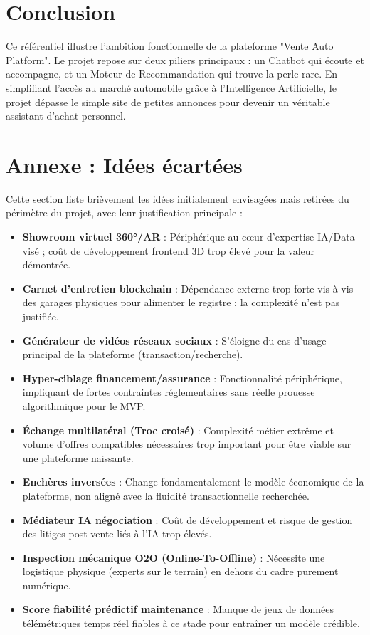 \documentclass[11pt,a4paper]{article}
\begin{document}
\section{Conclusion}
Ce référentiel illustre l'ambition fonctionnelle de la plateforme "Vente Auto Platform". Le projet repose sur deux piliers principaux : un Chatbot qui écoute et accompagne, et un Moteur de Recommandation qui trouve la perle rare. En simplifiant l'accès au marché automobile grâce à l'Intelligence Artificielle, le projet dépasse le simple site de petites annonces pour devenir un véritable assistant d'achat personnel.

\newpage
\appendix
\section{Annexe : Idées écartées}
Cette section liste brièvement les idées initialement envisagées mais retirées du périmètre du projet, avec leur justification principale :

\begin{itemize}
    \item \textbf{Showroom virtuel 360°/AR} : Périphérique au cœur d'expertise IA/Data visé ; coût de développement frontend 3D trop élevé pour la valeur démontrée.
    \item \textbf{Carnet d'entretien blockchain} : Dépendance externe trop forte vis-à-vis des garages physiques pour alimenter le registre ; la complexité n'est pas justifiée.
    \item \textbf{Générateur de vidéos réseaux sociaux} : S'éloigne du cas d'usage principal de la plateforme (transaction/recherche).
    \item \textbf{Hyper-ciblage financement/assurance} : Fonctionnalité périphérique, impliquant de fortes contraintes réglementaires sans réelle prouesse algorithmique pour le MVP.
    \item \textbf{Échange multilatéral (Troc croisé)} : Complexité métier extrême et volume d'offres compatibles nécessaires trop important pour être viable sur une plateforme naissante.
    \item \textbf{Enchères inversées} : Change fondamentalement le modèle économique de la plateforme, non aligné avec la fluidité transactionnelle recherchée.
    \item \textbf{Médiateur IA négociation} : Coût de développement et risque de gestion des litiges post-vente liés à l'IA trop élevés.
    \item \textbf{Inspection mécanique O2O (Online-To-Offline)} : Nécessite une logistique physique (experts sur le terrain) en dehors du cadre purement numérique.
    \item \textbf{Score fiabilité prédictif maintenance} : Manque de jeux de données télémétriques temps réel fiables à ce stade pour entraîner un modèle crédible.
\end{itemize}
\end{document}
